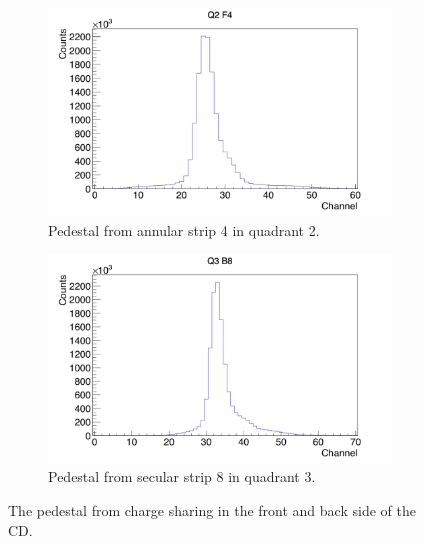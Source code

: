 \documentclass[twoside,english]{uiofysmaster/uiofysmaster}
\begin{document}
\begin{figure}[ht]
	\centering
	\begin{subfigure}{\textwidth}
		\centering
		\includegraphics[width=\textwidth]{../Plots/plotting/Pedestal_Q2_f4.png}
		\caption{Pedestal from annular strip 4 in quadrant 2.}
		\label{fig:Pedestal_f}
	\end{subfigure}
	\begin{subfigure}{\textwidth}
		\centering
		\includegraphics[width=\textwidth]{../Plots/plotting/Pedestal_Q3_b8.png}
		\caption{Pedestal from secular strip 8 in quadrant 3.}
		\label{fig:Pedestal_b}
	\end{subfigure}
	\caption{The pedestal from charge sharing in the front and back side of the CD.}
	\label{fig:Pedestal}
\end{figure}
\end{document}
